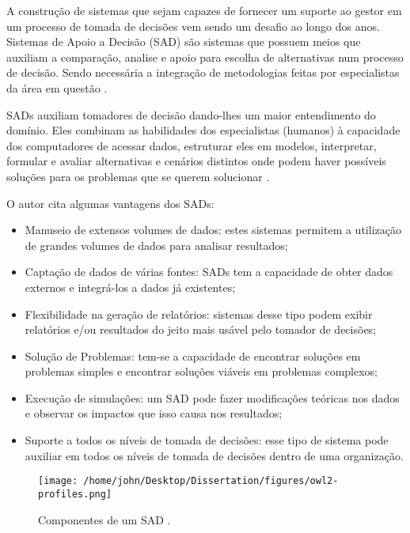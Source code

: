 A construção de sistemas que sejam capazes de fornecer um suporte
ao gestor em um processo de tomada de decisões vem sendo um desafio
ao longo dos anos. Sistemas de Apoio a Decisão (SAD) 
são sistemas que possuem meios que auxiliam a comparação, analise
e apoio para escolha de alternativas num processo de decisão. Sendo
necessária a integração de metodologias feitas por especialistas da
área em questão \citet{heinzle2010semantica}.

SADs auxiliam tomadores de decisão dando-lhes um maior entendimento
do domínio. Eles combinam as habilidades dos especialistas (humanos)
à capacidade dos computadores de acessar dados, estruturar eles em
modelos, interpretar, formular e avaliar alternativas e cenários distintos
onde podem haver possíveis soluções para os problemas que se querem
solucionar \citet{lu2006application}.

O autor \citet{junior2006sistemas} cita algumas vantagens dos SADs:
\begin{itemize}
\item Manuseio de extensos volumes de dados: estes sistemas permitem a utilização
de grandes volumes de dados para analisar resultados;
\item Captação de dados de várias fontes: SADs tem a capacidade de obter
dados externos e integrá-los a dados já existentes;
\item Flexibilidade na geração de relatórios: sistemas desse tipo podem
exibir relatórios e/ou resultados do jeito mais usável pelo tomador
de decisões;
\item Solução de Problemas: tem-se a capacidade de encontrar soluções em
problemas simples e encontrar soluções viáveis em problemas complexos;
\item Execução de simulações: um SAD pode fazer modificações teóricas nos
dados e observar os impactos que isso causa nos resultados;
\item Suporte a todos os níveis de tomada de decisões: esse tipo de sistema
pode auxiliar em todos os níveis de tomada de decisões dentro de uma
organização.
\end{itemize}
\begin{figure}[H]
\noindent \begin{centering}
\texttt{[image: /home/john/Desktop/Dissertation/figures/owl2-profiles.png]}
\par\end{centering}
\caption{Componentes de um SAD \citet{junior2006sistemas}.\label{fig:Componentes-SAD}}
\end{figure}

